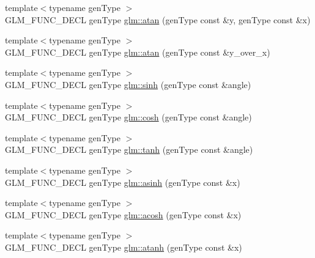 \begin{DoxyCompactItemize}
\item 
{\footnotesize template$<$typename gen\+Type $>$ }\\G\+L\+M\+\_\+\+F\+U\+N\+C\+\_\+\+D\+E\+CL gen\+Type \hyperlink{group__core__func__trigonometric_gabf80ac0817d1db032dd6a0969aa2b84a}{glm\+::atan} (gen\+Type const \&y, gen\+Type const \&x)
\item 
{\footnotesize template$<$typename gen\+Type $>$ }\\G\+L\+M\+\_\+\+F\+U\+N\+C\+\_\+\+D\+E\+CL gen\+Type \hyperlink{group__core__func__trigonometric_gaa7be96f0c12a40eeac5c7f04a3d465a1}{glm\+::atan} (gen\+Type const \&y\+\_\+over\+\_\+x)
\item 
{\footnotesize template$<$typename gen\+Type $>$ }\\G\+L\+M\+\_\+\+F\+U\+N\+C\+\_\+\+D\+E\+CL gen\+Type \hyperlink{group__core__func__trigonometric_ga2e8c9a896e803661058de83429aa6eda}{glm\+::sinh} (gen\+Type const \&angle)
\item 
{\footnotesize template$<$typename gen\+Type $>$ }\\G\+L\+M\+\_\+\+F\+U\+N\+C\+\_\+\+D\+E\+CL gen\+Type \hyperlink{group__core__func__trigonometric_gaa7685634f6e920ba9a683e5ec7aed976}{glm\+::cosh} (gen\+Type const \&angle)
\item 
{\footnotesize template$<$typename gen\+Type $>$ }\\G\+L\+M\+\_\+\+F\+U\+N\+C\+\_\+\+D\+E\+CL gen\+Type \hyperlink{group__core__func__trigonometric_ga941f20e5315113d1a2e037f073a62f04}{glm\+::tanh} (gen\+Type const \&angle)
\item 
{\footnotesize template$<$typename gen\+Type $>$ }\\G\+L\+M\+\_\+\+F\+U\+N\+C\+\_\+\+D\+E\+CL gen\+Type \hyperlink{group__core__func__trigonometric_gaa52acc1218a5ddd0f8d94fcd098685b1}{glm\+::asinh} (gen\+Type const \&x)
\item 
{\footnotesize template$<$typename gen\+Type $>$ }\\G\+L\+M\+\_\+\+F\+U\+N\+C\+\_\+\+D\+E\+CL gen\+Type \hyperlink{group__core__func__trigonometric_ga961d72b4a20d09d6e71fdf076ad4f433}{glm\+::acosh} (gen\+Type const \&x)
\item 
{\footnotesize template$<$typename gen\+Type $>$ }\\G\+L\+M\+\_\+\+F\+U\+N\+C\+\_\+\+D\+E\+CL gen\+Type \hyperlink{group__core__func__trigonometric_gaa20b78cb9c12e30bd5a3054b8cb3d099}{glm\+::atanh} (gen\+Type const \&x)
\end{DoxyCompactItemize}


